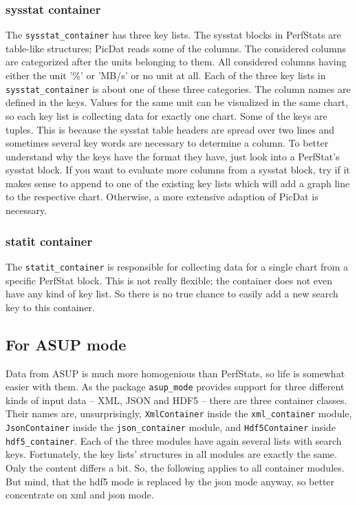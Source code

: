 \documentclass[a4paper,11pt]{article}
\begin{document}
\subsubsection*{sysstat container}
The \verb|sysstat_container| has three key lists. The sysstat blocks in PerfStats are table-like structures; PicDat reads some of the columns. The considered columns are categorized after the units belonging to them. All considered columns having either the unit '\%' or 'MB/s' or no unit at all. Each of the three key lists in \verb|sysstat_container| is about one of these three categories. The column names are defined in the keys. Values for the same unit can be visualized in the same chart, so each key list is collecting data for exactly one chart. Some of the keys are tuples. This is because the sysstat table headers are spread over two lines and sometimes several key words are necessary to determine a column. To better understand why the keys have the format they have, just look into a PerfStat's sysstat block. If you want to evaluate more columns from a sysstat block, try if it makes sense to append to one of the existing key lists which will add a graph line to the respective chart. Otherwise, a more extensive adaption of PicDat is necessary.

\subsubsection*{statit container}
The \verb|statit_container| is responsible for collecting data for a single chart from a specific PerfStat block. This is not really flexible; the container does not even have any kind of key list. So there is no true chance to easily add a new search key to this container.

\subsection*{For ASUP mode}
Data from ASUP is much more homogenious than PerfStats, so life is somewhat easier with them. As the package \verb|asup_mode| provides support for three different kinds of input data -- XML, JSON and HDF5 -- there are three container classes. Their names are, unsurprisingly, \verb|XmlContainer| inside the \verb|xml_container| module, \verb|JsonContainer| inside the \verb|json_container| module, and \verb|Hdf5Container| inside \verb|hdf5_container|. Each of the three modules have again several lists with search keys. Fortunately, the key lists' structures in all modules are exactly the same. Only the content differs a bit. So, the following applies to all container modules. But mind, that the hdf5 mode is replaced by the json mode anyway, so better concentrate on xml and json mode.
\end{document}

